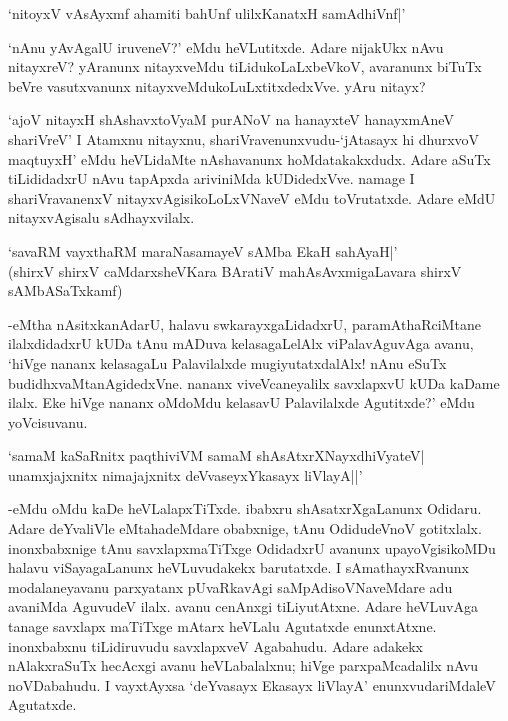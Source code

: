 \begin{shloka}
`nitoyxV vAsAyxmf ahamiti bahUnf ulilxKanatxH samAdhiVnf|'
\end{shloka}

`nAnu yAvAgalU iruveneV?' eMdu heVLutitxde. Adare nijakUkx nAvu nitayxreV? yAranunx nitayxveMdu tiLidukoLaLxbeVkoV, avaranunx biTuTx beVre vasutxvanunx nitayxveMdukoLuLxtitxdedxVve. yAru nitayx?

`ajoV nitayxH shAshavxtoV\s yaM purANoV na hanayxteV hanayxmAneV shariVreV' I Atamxnu nitayxnu, shariVravenunxvudu-`jAtasayx hi dhurxvoV maqtuyxH' eMdu heVLidaMte nAshavanunx hoMdatakakxdudx. Adare aSuTx tiLididadxrU nAvu tapApxda ariviniMda kUDidedxVve. namage I shariVravanenxV nitayxvAgisikoLoLxVNaveV eMdu toVrutatxde. Adare eMdU nitayxvAgisalu sAdhayxvilalx.

\begin{shloka}
`savaRM vayxthaRM maraNasamayeV sAMba EkaH sahAyaH|'\\
(shirxV shirxV caMdarxsheVKara BAratiV mahAsAvxmigaLavara shirxV\\
sAMbASaTxkamf)
\end{shloka}

-eMtha nAsitxkanAdarU, halavu swkarayxgaLidadxrU, paramAthaRciMtane ilalxdidadxrU kUDa tAnu mADuva kelasagaLelAlx viPalavAguvAga avanu, `hiVge nananx kelasagaLu Palavilalxde mugiyutatxdalAlx! nAnu eSuTx budidhxvaMtanAgidedxVne. nananx viveVcaneyalilx savxlapxvU kUDa kaDame ilalx. Eke hiVge nananx oMdoMdu kelasavU Palavilalxde Agutitxde?' eMdu yoVcisuvanu.

\begin{shloka}
`samaM kaSaRnitx paqthiviVM samaM shAsAtxrXNayxdhiVyateV|\\
unamxjajxnitx nimajajxnitx deVvaseyxYkasayx liVlayA||'
\end{shloka}

-eMdu oMdu kaDe heVLalapxTiTxde. ibabxru shAsatxrXgaLanunx Odidaru. Adare deYvaliVle eMtahadeMdare obabxnige, tAnu OdidudeVnoV gotitxlalx. inonxbabxnige tAnu savxlapxmaTiTxge OdidadxrU avanunx upayoVgisikoMDu halavu viSayagaLanunx heVLuvudakekx barutatxde. I sAmathayxRvanunx modalaneyavanu parxyatanx pUvaRkavAgi saMpAdisoVNaveMdare adu avaniMda AguvudeV ilalx. avanu cenAnxgi tiLiyutAtxne. Adare heVLuvAga tanage savxlapx maTiTxge mAtarx heVLalu Agutatxde enunxtAtxne. inonxbabxnu tiLidiruvudu savxlapxveV Agabahudu. Adare adakekx nAlakxraSuTx hecAcxgi avanu heVLabalalxnu; hiVge parxpaMcadalilx nAvu noVDabahudu. I vayxtAyxsa `deYvasayx Ekasayx liVlayA' enunxvudariMdaleV Agutatxde.

